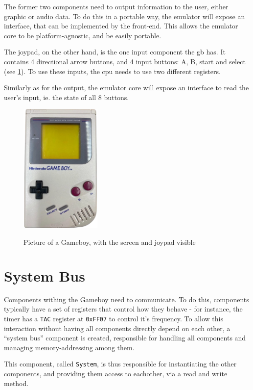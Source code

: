 \documentclass[11pt]{report}
\begin{document}
The former two components need to output information to the user, either graphic or audio data. To do this in a portable way, the emulator will expose an interface, that can be implemented by the front-end. This allows the emulator core to be platform-agnostic, and be easily portable.

The joypad, on the other hand, is the one input component the \gls{gb} has. It contains 4 directional arrow buttons, and 4 input buttons: A, B, start and select (see \ref{fig:gb-front}). To use these inputs, the \gls{cpu} needs to use two different registers.

Similarly as for the output, the emulator core will expose an interface to read  the user's input, ie. the state of all 8 buttons.

\begin{figure}[h]
    \centering
    \includegraphics[width=4cm]{images/gameboy}\\
    \caption{Picture of a Gameboy, with the screen and joypad visible}
    \label{fig:gb-front}
\end{figure}

\section{System Bus}

Components withing the Gameboy need to communicate. To do this, components typically have a set of registers that control how they behave - for instance, the timer has a \texttt{TAC} register at \texttt{0xFF07} to control it's frequency. To allow this interaction without having all components directly depend on each other, a ``system bus'' component is created, responsible for handling all components and managing memory-addressing among them.

This component, called \texttt{System}, is thus responsible for instantiating the other components, and providing them access to eachother, via a read and write method.
\end{document}
